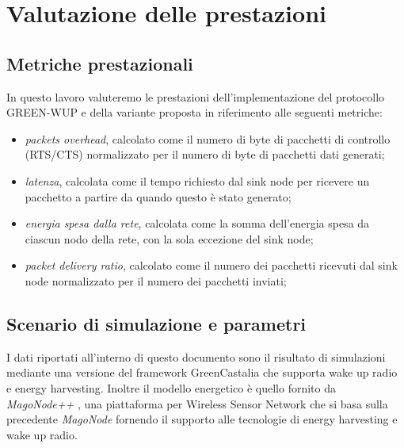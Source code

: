 \documentclass[binding=0.6cm,TFA]{sapthesis}
\begin{document}
\chapter{Valutazione delle prestazioni}

\section{Metriche prestazionali}

In questo lavoro valuteremo le prestazioni dell'implementazione del protocollo GREEN-WUP e della variante proposta in riferimento alle seguenti metriche:

\vspace{0.3em}

\begin{itemize}
    \itemsep0em
    \item \emph{packets overhead}, calcolato come il numero di byte di pacchetti di controllo (RTS/CTS) normalizzato per il numero di byte di pacchetti dati generati;
    \item \emph{latenza}, calcolata come il tempo richiesto dal sink node per ricevere un pacchetto a partire da quando questo è stato generato;
    \item \emph{energia spesa dalla rete}, calcolata come la somma dell'energia spesa da ciascun nodo della rete, con la sola eccezione del sink node;
    \item \emph{packet delivery ratio}, calcolato come il numero dei pacchetti ricevuti dal sink node normalizzato per il numero dei pacchetti inviati;
\end{itemize}

\section{Scenario di simulazione e parametri}

I dati riportati all'interno di questo documento sono il risultato di simulazioni mediante una versione del framework GreenCastalia \cite{greencastalia-paper}
che supporta wake up radio e energy harvesting. Inoltre il modello energetico è quello fornito da \emph{MagoNode++} \cite{magonode-pp-paper}, una
piattaforma per Wireless Sensor Network che si basa sulla precedente \emph{MagoNode} \cite{beyond-duty-cycling-paper} fornendo il supporto alle tecnologie di
energy harvesting e wake up radio.\\
\end{document}
